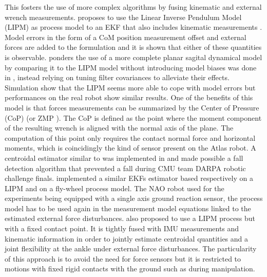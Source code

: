This fosters the use of more complex algorithms by fusing kinematic and external wrench measurements. \cite{stephens2011state} proposes to use the 
Linear Inverse Pendulum Model (LIPM) as process model to an EKF that also includes kinematic measurements . Model errors in the form of a CoM position measurement offset and external forces are added to the formulation and it is shown that
either of these quantities is observable. \cite{atkeson2012state} ponders the use of a more complete planar sagital dynamical model by comparing it to the LIPM model
without introducing model biases was done in \cite{stephens2011state}, instead relying on tuning filter covariances to alleviate their effects. 
Simulation show that the LIPM seems more able to cope with model errors but performances on the real robot show similar results. 
One of the benefits of this model is that forces measurements can be summarized by the Center of Pressure (CoP) 
(or ZMP \cite{sardain2004forces}). The CoP is defined as the point where the moment component of the resulting wrench is aligned with the normal axis of the plane.
The computation of this point only requires the contact normal force and horizontal moments, which is coincidingly the kind of
sensor present on the Atlas robot. A centroidal estimator similar to \cite{stephens2011state} was implemented in \cite{xinjilefu2015center} and made possible
a fall detection algorithm that prevented a fall during CMU team DARPA robotic challenge finals. \cite{piperakis2016non, piperakis2018nonlinear} implemented a similar 
EKFs estimator based respectively on a LIPM and on a fly-wheel process model. The NAO robot used for the experiments being equipped with a single axis ground reaction sensor,
the process model has to be used again in the measurement model equations linked to the estimated external force disturbances.   
\cite{benallegue2015estimation} also proposed to use a LIPM process but with a fixed contact point. It is tightly fused with IMU 
measurements and kinematic information in order to jointly estimate centroidal quantities 
and a joint flexibility at the ankle under external force disturbances. The particularity of this approach is to avoid the need for force sensors but
it is restricted to motions with fixed rigid contacts with the ground such as during manipulation.


